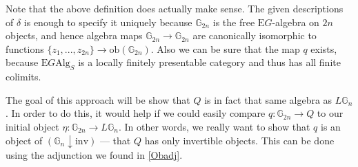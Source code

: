 Note that the above definition does actually make sense. The given descriptions of $\delta$ is enough to specify it uniquely because $\mathbb{G}_{2n}$ is the free $\mathrm{E}G$-algebra on $2n$ objects, and hence algebra maps $\mathbb{G}_{2n} \to \mathbb{G}_{2n}$ are canonically isomorphic to functions $\{z_1, ..., z_{2n}\} \to \mathrm{ob}(\mathbb{G}_{2n})$. Also we can be sure that the map $q$ exists, because $\mathrm{E}G\mathrm{Alg}_S$ is a locally finitely presentable category and thus has all finite colimits.

The goal of this approach will be show that $Q$ is in fact that same algebra as $L\mathbb{G}_n$. In order to do this, it would help if we could easily compare $q: \mathbb{G}_{2n} \to Q$ to our initial object $\eta: \mathbb{G}_{2n} \to L\mathbb{G}_n$. In other words, we really want to show that $q$ is an object of $(\mathbb{G}_n \downarrow \mathrm{inv})$ --- that $Q$ has only invertible objects. This can be done using the adjunction we found in \cref{Obadj}.

